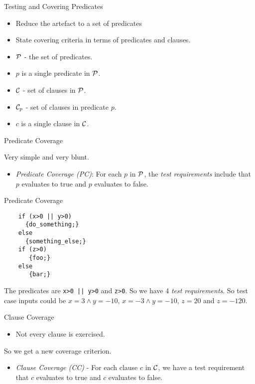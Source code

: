 \documentclass{beamer}
\newcommand{\predset}{{\cal P}}
\newcommand{\clauseset}{{\cal C}}
\begin{document}
\begin{frame}{Testing and Covering Predicates}
  \begin{itemize}
  \item Reduce the artefact to a set of predicates
  \item State covering criteria in terms of predicates and clauses.  
  \end{itemize}
  \begin{itemize}
  \item $\predset$ - the set of predicates.
  \item $p$ is a single predicate in $\predset$.
  \item $\clauseset$ - set of clauses in $\predset$.
  \item $\clauseset_p$ - set of clauses in predicate $p$.
   \item $c$ is a single clause in $\clauseset$.
  \end{itemize}
\end{frame}
\begin{frame}{Predicate Coverage}

Very simple and very blunt.
  \begin{itemize}
  \item {\em Predicate Coverage (PC)}: For each $p$ in $\predset$, the {\it test requirements}
   include that $p$ evaluates to true and $p$ evaluates to false. 
  \end{itemize}

\end{frame}
\begin{frame}[fragile]{Predicate Coverage}

  \begin{lstlisting}
    if (x>0 || y>0) 
      {do_something;} 
    else
      {something_else;}
    if (z>0) 
       {foo;}
    else
       {bar;}
  \end{lstlisting}
The predicates are \verb+x>0 || y>0+ and \verb+z>0+. So we have 4 {\it test
requirements}. So test case inputs could be $x=3\land y=-10$,
$x=-3\land y=-10$, $z=20$ and $z=-120$.
\end{frame}
\begin{frame}{Clause Coverage}
  \begin{itemize}
  \item Not every clause is exercised. 
  \end{itemize}
So we get a new coverage criterion.
\begin{itemize}
\item {\em Clause Coverage (CC)} - For each clause $c$ in
  $\clauseset$, we have a test requirement that $c$ evaluates to true
  and $c$ evaluates to false.
\end{itemize}
\end{frame}
\end{document}
